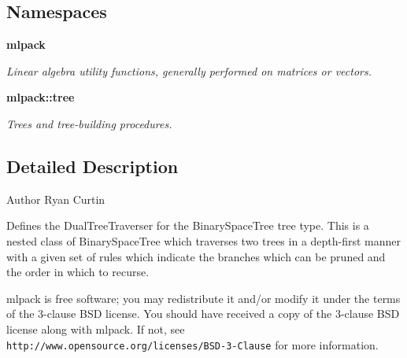 \subsection*{Namespaces}
\begin{DoxyCompactItemize}
\item 
 \textbf{ mlpack}
\begin{DoxyCompactList}\small\item\em Linear algebra utility functions, generally performed on matrices or vectors. \end{DoxyCompactList}\item 
 \textbf{ mlpack\+::tree}
\begin{DoxyCompactList}\small\item\em Trees and tree-\/building procedures. \end{DoxyCompactList}\end{DoxyCompactItemize}


\subsection{Detailed Description}
\begin{DoxyAuthor}{Author}
Ryan Curtin
\end{DoxyAuthor}
Defines the Dual\+Tree\+Traverser for the Binary\+Space\+Tree tree type. This is a nested class of Binary\+Space\+Tree which traverses two trees in a depth-\/first manner with a given set of rules which indicate the branches which can be pruned and the order in which to recurse.

mlpack is free software; you may redistribute it and/or modify it under the terms of the 3-\/clause B\+SD license. You should have received a copy of the 3-\/clause B\+SD license along with mlpack. If not, see {\tt http\+://www.\+opensource.\+org/licenses/\+B\+S\+D-\/3-\/\+Clause} for more information. 